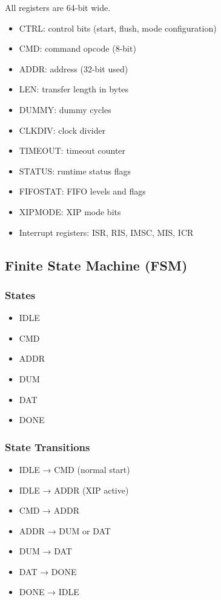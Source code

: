 All registers are 64-bit wide.

\begin{itemize}
  \item CTRL: control bits (start, flush, mode configuration)
  \item CMD: command opcode (8-bit)
  \item ADDR: address (32-bit used)
  \item LEN: transfer length in bytes
  \item DUMMY: dummy cycles
  \item CLKDIV: clock divider
  \item TIMEOUT: timeout counter
  \item STATUS: runtime status flags
  \item FIFOSTAT: FIFO levels and flags
  \item XIPMODE: XIP mode bits
  \item Interrupt registers: ISR, RIS, IMSC, MIS, ICR
\end{itemize}

\subsection{Finite State Machine (FSM)}

\subsubsection{States}

\begin{itemize}
  \item IDLE
  \item CMD
  \item ADDR
  \item DUM
  \item DAT
  \item DONE
\end{itemize}

\subsubsection{State Transitions}

\begin{itemize}
  \item IDLE → CMD (normal start)
  \item IDLE → ADDR (XIP active)
  \item CMD → ADDR
  \item ADDR → DUM or DAT
  \item DUM → DAT
  \item DAT → DONE
  \item DONE → IDLE
\end{itemize}


